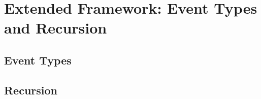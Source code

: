 \section{Extended Framework: Event Types and Recursion}\label{sec:extended}


\subsection{Event Types}



\subsection{Recursion}



